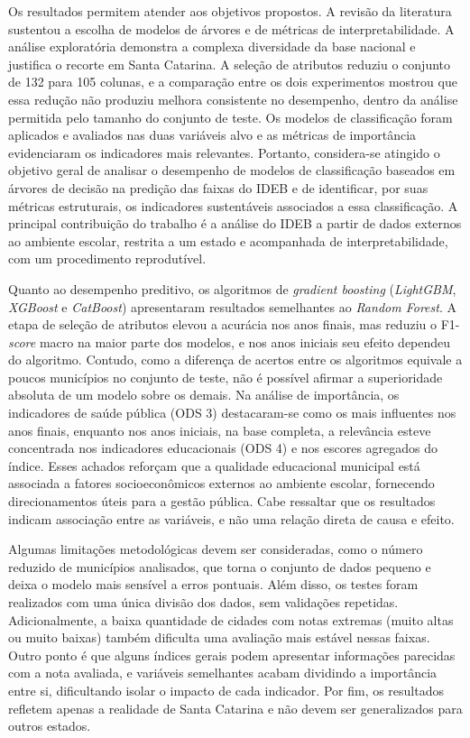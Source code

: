 Os resultados permitem atender aos objetivos propostos. A revisão da literatura sustentou a escolha de modelos de árvores e de métricas de interpretabilidade. A análise exploratória demonstra a complexa diversidade da base nacional e justifica o recorte em Santa Catarina. A seleção de atributos reduziu o conjunto de 132 para 105 colunas, e a comparação entre os dois experimentos mostrou que essa redução não produziu melhora consistente no desempenho, dentro da análise permitida pelo tamanho do conjunto de teste. Os modelos de classificação foram aplicados e avaliados nas duas variáveis alvo e as métricas de importância evidenciaram os indicadores mais relevantes. Portanto, considera-se atingido o objetivo geral de analisar o desempenho de modelos de classificação baseados em árvores de decisão na predição das faixas do IDEB e de identificar, por suas métricas estruturais, os indicadores sustentáveis associados a essa classificação. A principal contribuição do trabalho é a análise do IDEB a partir de dados externos ao ambiente escolar, restrita a um estado e acompanhada de interpretabilidade, com um procedimento reprodutível.

Quanto ao desempenho preditivo, os algoritmos de \textit{gradient boosting} (\textit{LightGBM}, \textit{XGBoost} e \textit{CatBoost}) apresentaram resultados semelhantes ao \textit{Random Forest}. A etapa de seleção de atributos elevou a acurácia nos anos finais, mas reduziu o F1-\textit{score} macro na maior parte dos modelos, e nos anos iniciais seu efeito dependeu do algoritmo. Contudo, como a diferença de acertos entre os algoritmos equivale a poucos municípios no conjunto de teste, não é possível afirmar a superioridade absoluta de um modelo sobre os demais. Na análise de importância, os indicadores de saúde pública (ODS 3) destacaram-se como os mais influentes nos anos finais, enquanto nos anos iniciais, na base completa, a relevância esteve concentrada nos indicadores educacionais (ODS 4) e nos escores agregados do índice. Esses achados reforçam que a qualidade educacional municipal está associada a fatores socioeconômicos externos ao ambiente escolar, fornecendo direcionamentos úteis para a gestão pública. Cabe ressaltar que os resultados indicam associação entre as variáveis, e não uma relação direta de causa e efeito.

Algumas limitações metodológicas devem ser consideradas, como o número reduzido de municípios analisados, que torna o conjunto de dados pequeno e deixa o modelo mais sensível a erros pontuais. Além disso, os testes foram realizados com uma única divisão dos dados, sem validações repetidas. Adicionalmente, a baixa quantidade de cidades com notas extremas (muito altas ou muito baixas) também dificulta uma avaliação mais estável nessas faixas. Outro ponto é que alguns índices gerais podem apresentar informações parecidas com a nota avaliada, e variáveis semelhantes acabam dividindo a importância entre si, dificultando isolar o impacto de cada indicador. Por fim, os resultados refletem apenas a realidade de Santa Catarina e não devem ser generalizados para outros estados.

